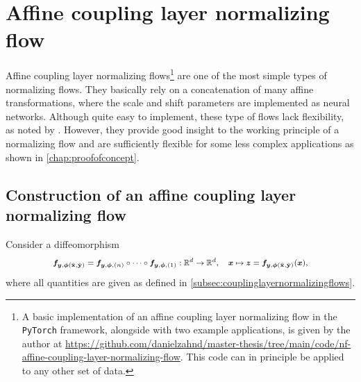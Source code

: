 \documentclass[a4paper,12pt]{report}
\begin{document}
\section{Affine coupling layer normalizing flow}\label{subsec:normflowsaffinecouplinglayers}
Affine coupling layer normalizing flows\cprotect\footnote{A basic implementation of an affine coupling layer normalizing flow in the \verb|PyTorch| framework, alongside with two example applications, is given by the author at \url{https://github.com/danielzahnd/master-thesis/tree/main/code/nf-affine-coupling-layer-normalizing-flow}. This code can in principle be applied to any other set of data.\label{footnote:NF_code}} are one of the most simple types of normalizing flows. They basically rely on a concatenation of many affine transformations, where the scale and shift parameters are implemented as neural networks. Although quite easy to implement, these type of flows lack flexibility, as noted by \cite[p.3]{Durkan.10.06.2019}. However, they provide good insight to the working principle of a normalizing flow and are sufficiently flexible for some less complex applications as shown in \cref{chap:proofofconcept}.
 
\subsection{Construction of an affine coupling layer normalizing flow}
Consider a diffeomorphism \begin{align}\footnotesize \begin{aligned}
\bm{f}_{\bm{y},\bm{\phi}(\hat{\boldsymbol{\mathbf{x}}},\hat{\boldsymbol{\mathbf{y}}})} = \bm{f}_{\bm{y},\bm{\phi},(n)}\circ \dots \circ \bm{f}_{\bm{y},\bm{\phi},(1)}: \mathbb{R}^d \rightarrow \mathbb{R}^d, \quad \bm{x} \mapsto \bm{z} = \bm{f}_{\bm{y},\bm{\phi}(\hat{\boldsymbol{\mathbf{x}}},\hat{\boldsymbol{\mathbf{y}}})}(\bm{x}),
\end{aligned}\end{align} where all quantities are given as defined in \cref{subsec:couplinglayernormalizingflows}. 
\end{document}
